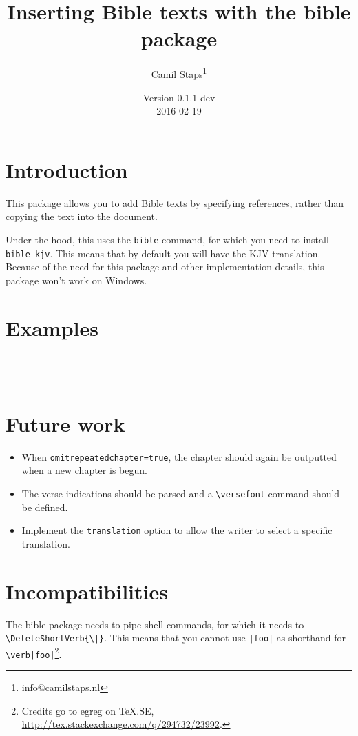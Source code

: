 \documentclass[a4paper]{ltxguide}
\title{Inserting Bible texts with the \textsf{bible} package}
\author{Camil Staps\footnote{info@camilstaps.nl}}
\date{Version 0.1.1-dev\\2016-02-19}
\newenvironment{example}
  {\VerbatimOut{\jobname.tmp}}
  {\endVerbatimOut
    \begin{framed}
      \setlength{\parskip}{-10pt}
      \inputminted[xleftmargin=-8pt]{latex}{\jobname.tmp}
      \medskip
      
    \end{framed}}
\begin{document}
\maketitle

\section{Introduction}
This package allows you to add Bible texts by specifying references, rather than copying the text into the document.

Under the hood, this uses the \texttt{bible} command, for which you need to install \texttt{bible-kjv}. This means that by default you will have the KJV translation. Because of the need for this package and other implementation details, this package won't work on Windows.

\section{Examples}
\begin{example}
\end{example}

\begin{example}
\end{example}

\begin{example}
\end{example}

\begin{example}
\end{example}

\section{Future work}
\begin{itemize}
  \item When \verb$omitrepeatedchapter=true$, the chapter should again be outputted when a new chapter is begun.
  \item The verse indications should be parsed and a \verb$\versefont$ command should be defined.
  \item Implement the \verb$translation$ option to allow the writer to select a specific translation.
\end{itemize}

\section{Incompatibilities}
The \textsf{bible} package needs to pipe shell commands, for which it needs to \verb$\DeleteShortVerb{\|}$. This means that you cannot use \verb$|foo|$ as shorthand for \verb$\verb|foo|$\footnote{Credits go to egreg on TeX.SE, \url{http://tex.stackexchange.com/q/294732/23992}.}.
\end{document}
